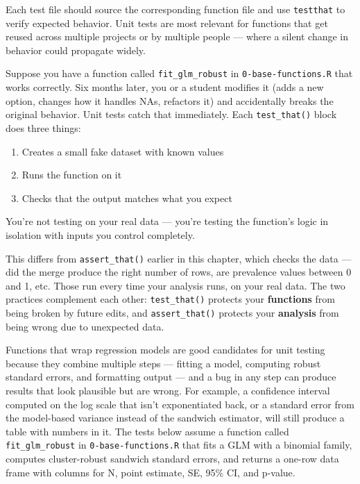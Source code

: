 \documentclass[
]{book}
\providecommand{\tightlist}{%
  \setlength{\itemsep}{0pt}\setlength{\parskip}{0pt}}
\begin{document}
Each test file should source the corresponding function file and use \texttt{testthat} to verify expected behavior. Unit tests are most relevant for functions that get reused across multiple projects or by multiple people --- where a silent change in behavior could propagate widely.

Suppose you have a function called \texttt{fit\_glm\_robust} in \texttt{0-base-functions.R} that works correctly. Six months later, you or a student modifies it (adds a new option, changes how it handles NAs, refactors it) and accidentally breaks the original behavior. Unit tests catch that immediately. Each \texttt{test\_that()} block does three things:

\begin{enumerate}
\def\labelenumi{\arabic{enumi}.}
\tightlist
\item
  Creates a small fake dataset with known values
\item
  Runs the function on it
\item
  Checks that the output matches what you expect
\end{enumerate}

You're not testing on your real data --- you're testing the function's logic in isolation with inputs you control completely.

This differs from \texttt{assert\_that()} earlier in this chapter, which checks the data --- did the merge produce the right number of rows, are prevalence values between 0 and 1, etc. Those run every time your analysis runs, on your real data. The two practices complement each other: \texttt{test\_that()} protects your \textbf{functions} from being broken by future edits, and \texttt{assert\_that()} protects your \textbf{analysis} from being wrong due to unexpected data.

Functions that wrap regression models are good candidates for unit testing because they combine multiple steps --- fitting a model, computing robust standard errors, and formatting output --- and a bug in any step can produce results that look plausible but are wrong. For example, a confidence interval computed on the log scale that isn't exponentiated back, or a standard error from the model-based variance instead of the sandwich estimator, will still produce a table with numbers in it. The tests below assume a function called \texttt{fit\_glm\_robust} in \texttt{0-base-functions.R} that fits a GLM with a binomial family, computes cluster-robust sandwich standard errors, and returns a one-row data frame with columns for N, point estimate, SE, 95\% CI, and p-value.
\end{document}
